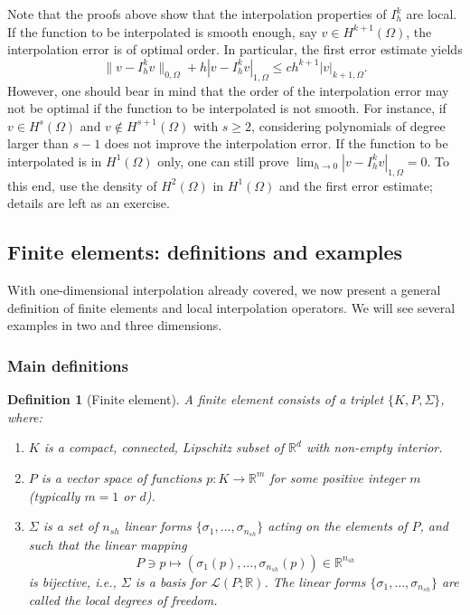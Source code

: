 \documentclass{article}
\newtheorem{definition}{Definition}
\begin{document}
Note that the proofs above show that the interpolation properties of $I_h^k$ are local. If the function to be interpolated is smooth enough, say $v \in H^{k+1}(\Omega)$, the interpolation error is of optimal order. In particular, the first error estimate yields
$$ \|v - I_h^k v\|_{0,\Omega} + h |v - I_h^k v|_{1,\Omega} \le c h^{k+1} |v|_{k+1,\Omega}. $$
However, one should bear in mind that the order of the interpolation error may not be optimal if the function to be interpolated is not smooth. For instance, if $v \in H^s(\Omega)$ and $v \notin H^{s+1}(\Omega)$ with $s \ge 2$, considering polynomials of degree larger than $s-1$ does not improve the interpolation error. If the function to be interpolated is in $H^1(\Omega)$ only, one can still prove $\lim_{h \rightarrow 0} |v - I_h^k v|_{1,\Omega} = 0$. To this end, use the density of $H^2(\Omega)$ in $H^1(\Omega)$ and the first error estimate; details are left as an exercise.

\subsection{Finite elements: definitions and examples}
With one-dimensional interpolation already covered, we now present a general definition of finite elements and local interpolation operators. We will see several examples in two and three dimensions. 

\subsubsection{Main definitions}
\begin{definition}[Finite element]\label{def:finiteelements}
    A finite element consists of a triplet $\{K, P, \Sigma\}$, where:
    \begin{enumerate}
        \item $K$ is a compact, connected, Lipschitz subset of $\mathbb{R}^d$ with non-empty interior.
        \item $P$ is a vector space of functions $p: K \rightarrow \mathbb{R}^m$ for some positive integer $m$ (typically $m = 1$ or $d$).
        \item $\Sigma$ is a set of $n_{sh}$ linear forms $\{\sigma_1, \dots, \sigma_{n_{sh}}\}$ acting on the elements of $P$, and such that the linear mapping
        \begin{equation*}
            \label{eq:finite_element_mapping}
            P \ni p \mapsto (\sigma_1(p), \dots, \sigma_{n_{sh}}(p)) \in \mathbb{R}^{n_{sh}}
        \end{equation*}
        is bijective, i.e., $\Sigma$ is a basis for $\mathcal{L}(P; \mathbb{R})$. The linear forms $\{\sigma_1, \dots, \sigma_{n_{sh}}\}$ are called the local degrees of freedom.
    \end{enumerate}
\end{definition}
\end{document}
